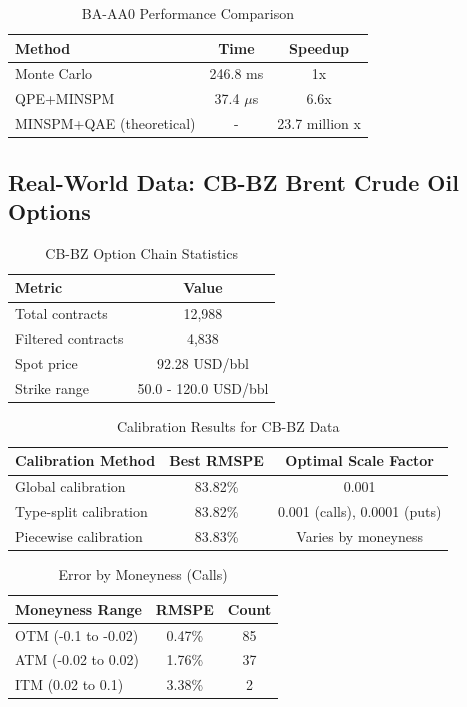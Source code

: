 \documentclass[12pt]{article}
\begin{document}
\begin{table}[h]
\centering
\caption{BA-AA0 Performance Comparison}
\begin{tabular}{lcc}
\toprule
Method & Time & Speedup \\
\midrule
Monte Carlo & 246.8 ms & 1x \\
QPE+MINSPM & 37.4 $\mu$s & 6.6x \\
MINSPM+QAE (theoretical) & - & 23.7 million x \\
\bottomrule
\end{tabular}
\end{table}

\subsection{Real-World Data: CB-BZ Brent Crude Oil Options}

\begin{table}[h]
\centering
\caption{CB-BZ Option Chain Statistics}
\begin{tabular}{lc}
\toprule
Metric & Value \\
\midrule
Total contracts & 12,988 \\
Filtered contracts & 4,838 \\
Spot price & 92.28 USD/bbl \\
Strike range & 50.0 - 120.0 USD/bbl \\
\bottomrule
\end{tabular}
\end{table}

\begin{table}[h]
\centering
\caption{Calibration Results for CB-BZ Data}
\begin{tabular}{lcc}
\toprule
Calibration Method & Best RMSPE & Optimal Scale Factor \\
\midrule
Global calibration & 83.82\% & 0.001 \\
Type-split calibration & 83.82\% & 0.001 (calls), 0.0001 (puts) \\
Piecewise calibration & 83.83\% & Varies by moneyness \\
\bottomrule
\end{tabular}
\end{table}

\begin{table}[h]
\centering
\caption{Error by Moneyness (Calls)}
\begin{tabular}{lcc}
\toprule
Moneyness Range & RMSPE & Count \\
\midrule
OTM (-0.1 to -0.02) & 0.47\% & 85 \\
ATM (-0.02 to 0.02) & 1.76\% & 37 \\
ITM (0.02 to 0.1) & 3.38\% & 2 \\
\bottomrule
\end{tabular}
\end{table}
\end{document}

